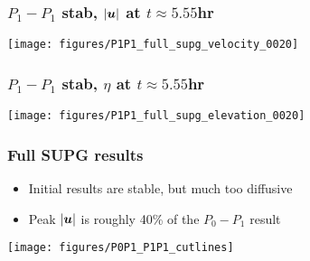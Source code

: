\begin{frame}[t]
  \frametitle{$P_1-P_1$ stab, $|{\boldsymbol{u}}|$ at $t\approx 5.55$hr}
\vspace{-0.2in}
  \begin{center}
    \texttt{[image: figures/P1P1\_full\_supg\_velocity\_0020]}
  \end{center}
\end{frame}

\begin{frame}[t]
  \frametitle{$P_1-P_1$ stab, $\eta$ at $t\approx 5.55$hr}
\vspace{-0.2in}
  \begin{center}
    \texttt{[image: figures/P1P1\_full\_supg\_elevation\_0020]}
  \end{center}
\end{frame}

\begin{frame}[t]
  \frametitle{Full SUPG results}
  \begin{itemize}
    \item{Initial results are stable, but much too diffusive}
    \item{Peak $|{\boldsymbol{u}}|$ is roughly 40\% of the $P_0-P_1$ result}
  \end{itemize}
  \vspace{-.2in}
  \begin{center}
    \texttt{[image: figures/P0P1\_P1P1\_cutlines]}
  \end{center}
\end{frame}
